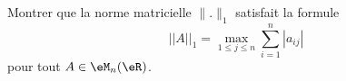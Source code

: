 \begin{exercice}[\coolexo]\label{exoGeomAnal-0042}


Montrer que la norme matricielle \( \| . \|_1\) satisfait la formule 
\begin{equation}
||A||_1=\max_{1\le j\le n}\sum_{i=1}^n|a_{ij}|
\end{equation}
pour tout $A\in \eM_n(\eR)$.

\end{exercice}
